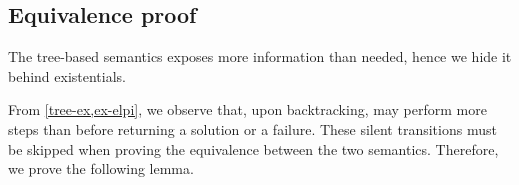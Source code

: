 




\subsection{Equivalence proof}

The tree-based semantics exposes more information than needed, hence
we hide it behind existentials.






From \cref{tree-ex,ex-elpi}, we observe that, upon backtracking, \runT may perform
more steps than \runS before returning a solution or a failure.
These silent transitions must be skipped
when proving the equivalence between the two semantics. Therefore, we
prove the following lemma.

